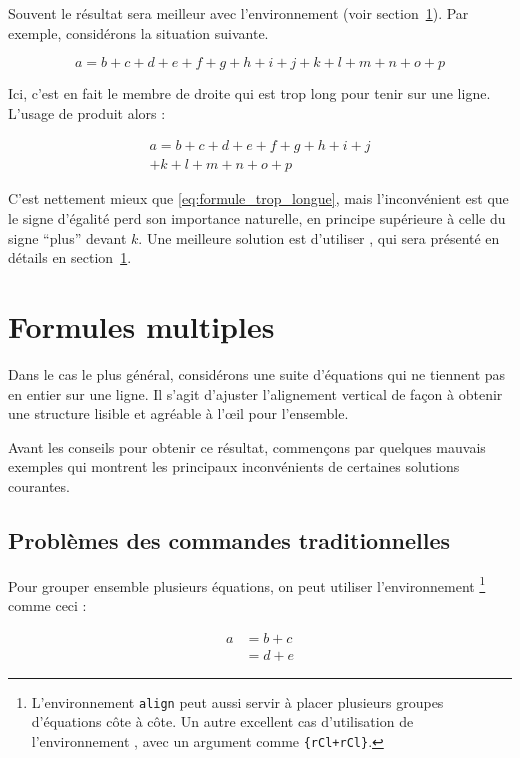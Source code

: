 Souvent le résultat sera
meilleur avec l'environnement  (voir
section~\ref{sec:IEEEeqnarray}). Par exemple, considérons la situation
suivante.
\begin{example}
\begin{equation}
  a = b + c + d + e + f
  + g + h + i + j
  + k + l + m + n + o + p
  \label{eq:formule_trop_longue}
\end{equation}
\end{example}
\noindent
Ici, c'est en fait le membre de droite qui est trop long pour tenir sur une
ligne. L'usage de  produit alors :
\begin{example}
\begin{multline}
  a = b + c + d + e + f
  + g + h + i + j \\
  + k + l + m + n + o + p
\end{multline}
\end{example}

C'est nettement mieux que \eqref{eq:formule_trop_longue}, mais
l'inconvénient est que le signe d'égalité perd son importance naturelle, en
principe supérieure à celle du signe \enquote{plus} devant $k$. Une meilleure
solution est d'utiliser , qui sera présenté en détails en
section~\ref{sec:IEEEeqnarray}.


\section{Formules multiples}
\label{sec:IEEEeqnarray}

Dans le cas le plus général, considérons une suite d'équations qui ne tiennent
pas en entier sur une ligne. Il s'agit d'ajuster l'alignement vertical de
façon à obtenir une structure lisible et agréable à l'\oe il pour l'ensemble.

Avant les conseils pour obtenir ce résultat, commençons par quelques mauvais
exemples qui montrent les principaux inconvénients de certaines solutions
courantes.

\subsection{Problèmes des commandes traditionnelles}
\label{sec:problems_traditional}

Pour grouper ensemble plusieurs équations, on peut utiliser
l'environnement \footnote{L'environnement \texttt{align} peut aussi
  servir à placer plusieurs groupes d'équations côte à côte. Un autre excellent
  cas d'utilisation de l'environnement , avec un
  argument comme
  \texttt{\{rCl+rCl\}}.} comme ceci :
\begin{example}
 \begin{align}
  a & = b + c \\
  & = d + e
 \end{align}
\end{example}

